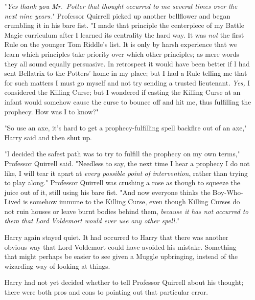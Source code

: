 "\emph{Yes thank you Mr.~Potter that thought occurred to me several times over 
the next nine years.}" Professor Quirrell picked up another bellflower and 
began crumbling it in his bare fist. "I made that principle the centerpiece of 
my Battle Magic curriculum after I learned its centrality the hard way. It was 
\emph{not} the first Rule on the younger Tom Riddle's list. It is only by harsh 
experience that we learn which principles take priority over which other 
principles; as mere words they all sound equally persuasive. In retrospect it 
would have been better if I had sent Bellatrix to the Potters' home in my 
place; but I had a Rule telling me that for such matters I must go myself and 
not try sending a trusted lieutenant. \emph{Yes,} I considered the Killing 
Curse; but I wondered if casting the Killing Curse at an infant would somehow 
cause the curse to bounce off and hit me, thus fulfilling the prophecy. How was 
I to know?"

"So use an axe, it's hard to get a prophecy-fulfilling spell backfire out of an 
axe," Harry said and then shut up.

"I decided the safest path was to try to fulfill the prophecy on my own terms," 
Professor Quirrell said. "Needless to say, the next time I hear a prophecy I do 
not like, I will tear it apart at \emph{every possible point of intervention}, 
rather than trying to play along." Professor Quirrell was crushing a rose as 
though to squeeze the juice out of it, still using his bare fist. "And now 
everyone thinks the Boy-Who-Lived is somehow immune to the Killing Curse, even 
though Killing Curses do not ruin houses or leave burnt bodies behind them, 
\emph{because it has not occurred to them that Lord Voldemort would ever use 
any other spell.}"

Harry again stayed quiet. It had occurred to Harry that there was another 
obvious way that Lord Voldemort could have avoided his mistake. Something that 
might perhaps be easier to see given a Muggle upbringing, instead of the 
wizarding way of looking at things.

Harry had not yet decided whether to tell Professor Quirrell about his thought; 
there were both pros and cons to pointing out that particular error.

